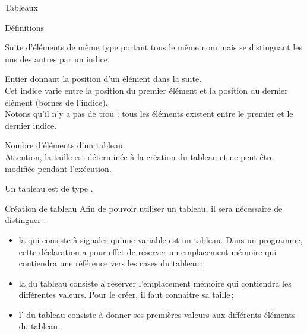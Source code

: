 \begin{frame}{Tableaux}
  \begin{block}{Définitions}
    \begin{description}[<+->]
      \item[Tableau]
        Suite d’éléments de même type portant tous le même nom mais se
        distinguant les uns des autres par un indice.
      \item[Indice]
        Entier
        donnant la position d’un élément dans la suite.\\
        Cet indice varie entre la position du premier élément
        et la position du dernier élément (bornes de l’indice).\\
        Notons qu’il n’y a pas de \og trou \fg:
        tous les éléments existent entre le premier et le dernier indice.
      \item[Taille]
        Nombre d'éléments d'un tableau.\\
        Attention, la taille est déterminée à la création du
        tableau et ne peut être modifiée pendant l'exécution.
    \end{description}
  \end{block}

  Un tableau est de type .
\end{frame}

\begin{frame}{Création de tableau}
  Afin de pouvoir utiliser un tableau, il sera nécessaire de distinguer :
  \begin{itemize}
    \item la  qui consiste à signaler qu'une
      variable est un tableau. Dans un programme, cette déclaration
      a pour effet de réserver un emplacement mémoire qui contiendra
      une référence vers les cases du tableau\,;

    \item la  du tableau consiste a réserver
      l'emplacement mémoire qui contiendra les différentes valeurs.
      Pour le créer, il faut connaitre sa taille\,;

    \item l' du tableau consiste à donner ses
      premières valeurs aux différents éléments du tableau.

  \end{itemize}
\end{frame}

